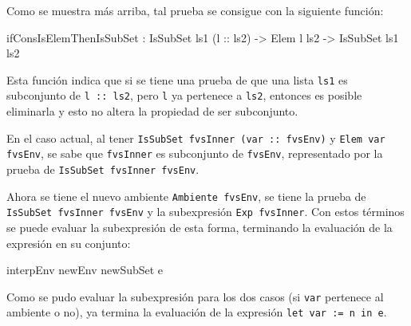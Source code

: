 Como se muestra más arriba, tal prueba se consigue con la siguiente función:

\begin{code}
ifConsIsElemThenIsSubSet : IsSubSet ls1 (l :: ls2) ->
  Elem l ls2 -> IsSubSet ls1 ls2
\end{code}

Esta función indica que si se tiene una prueba de que una lista \texttt{ls1} es subconjunto de \texttt{l :: ls2}, pero \texttt{l} ya pertenece a \texttt{ls2}, entonces es posible eliminarla y esto no altera la propiedad de ser subconjunto.

En el caso actual, al tener \texttt{IsSubSet fvsInner (var :: fvsEnv)} y \texttt{Elem var fvsEnv}, se sabe que \texttt{fvsInner} es subconjunto de \texttt{fvsEnv}, representado por la prueba de \texttt{IsSubSet fvsInner fvsEnv}.

Ahora se tiene el nuevo ambiente \texttt{Ambiente fvsEnv}, se tiene la prueba de \texttt{IsSubSet fvsInner fvsEnv} y la subexpresión \texttt{Exp fvsInner}. Con estos términos se puede evaluar la subexpresión de esta forma, terminando la evaluación de la expresión en su conjunto:

\begin{code}
interpEnv newEnv newSubSet e
\end{code}

Como se pudo evaluar la subexpresión para los dos casos (si \texttt{var} pertenece al ambiente o no), ya termina la evaluación de la expresión \texttt{let var := n in e}.
